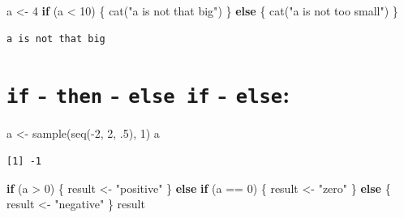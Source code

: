 \documentclass[
]{book}
\newenvironment{Shaded}{\begin{snugshade}}{\end{snugshade}}
\newcommand{\ControlFlowTok}[1]{\textcolor[rgb]{0.13,0.29,0.53}{\textbf{#1}}}
\newcommand{\DecValTok}[1]{\textcolor[rgb]{0.00,0.00,0.81}{#1}}
\newcommand{\FunctionTok}[1]{\textcolor[rgb]{0.00,0.00,0.00}{#1}}
\newcommand{\NormalTok}[1]{#1}
\newcommand{\OtherTok}[1]{\textcolor[rgb]{0.56,0.35,0.01}{#1}}
\newcommand{\SpecialCharTok}[1]{\textcolor[rgb]{0.00,0.00,0.00}{#1}}
\newcommand{\StringTok}[1]{\textcolor[rgb]{0.31,0.60,0.02}{#1}}
\begin{document}
\begin{Shaded}
\begin{Highlighting}[]
\NormalTok{a }\OtherTok{\textless{}{-}} \DecValTok{4}
\ControlFlowTok{if}\NormalTok{ (a }\SpecialCharTok{\textless{}} \DecValTok{10}\NormalTok{) \{}
  \FunctionTok{cat}\NormalTok{(}\StringTok{"a is not that big"}\NormalTok{)}
\NormalTok{\} }\ControlFlowTok{else}\NormalTok{ \{}
  \FunctionTok{cat}\NormalTok{(}\StringTok{"a is not too small"}\NormalTok{)}
\NormalTok{\}}
\end{Highlighting}
\end{Shaded}

\begin{verbatim}
a is not that big
\end{verbatim}

\hypertarget{if---then---else-if---else}{%
\section{\texorpdfstring{\texttt{if} - \texttt{then} - \texttt{else\ if} - \texttt{else}:}{if - then - else if - else:}}\label{if---then---else-if---else}}

\begin{Shaded}
\begin{Highlighting}[]
\NormalTok{a }\OtherTok{\textless{}{-}} \FunctionTok{sample}\NormalTok{(}\FunctionTok{seq}\NormalTok{(}\SpecialCharTok{{-}}\DecValTok{2}\NormalTok{, }\DecValTok{2}\NormalTok{, .}\DecValTok{5}\NormalTok{), }\DecValTok{1}\NormalTok{)}
\NormalTok{a}
\end{Highlighting}
\end{Shaded}

\begin{verbatim}
[1] -1
\end{verbatim}

\begin{Shaded}
\begin{Highlighting}[]
\ControlFlowTok{if}\NormalTok{ (a }\SpecialCharTok{\textgreater{}} \DecValTok{0}\NormalTok{) \{}
\NormalTok{  result }\OtherTok{\textless{}{-}} \StringTok{"positive"}
\NormalTok{\} }\ControlFlowTok{else} \ControlFlowTok{if}\NormalTok{ (a }\SpecialCharTok{==} \DecValTok{0}\NormalTok{) \{}
\NormalTok{  result }\OtherTok{\textless{}{-}} \StringTok{"zero"}
\NormalTok{\} }\ControlFlowTok{else}\NormalTok{ \{}
\NormalTok{  result }\OtherTok{\textless{}{-}} \StringTok{"negative"}
\NormalTok{\}}
\NormalTok{result}
\end{Highlighting}
\end{Shaded}
\end{document}
